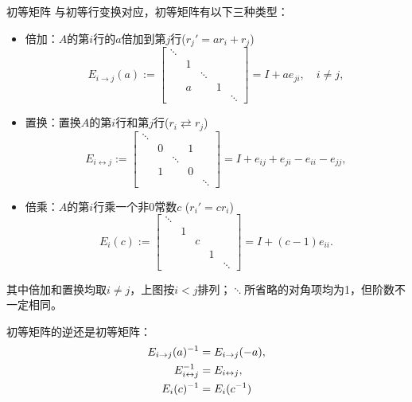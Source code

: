 \begin{definition}
	{初等矩阵}{}
	与初等行变换对应，初等矩阵有以下三种类型：
	\begin{itemize}
		\item 倍加：$A$的第$i$行的$a$倍加到第$j$行($r_j' = ar_i + r_j$)
		\begin{equation}\label{eq:la-row-addition-matrix}
			E_{i\to j}(a) :=
			\begin{bmatrix}
				\ddots\\ &1\\ &&\ddots\\ &a&&1\\ &&&&\ddots
			\end{bmatrix} = I + ae_{ji},\quad i \neq j,
		\end{equation}
		\item 置换：置换$A$的第$i$行和第$j$行($r_i\rightleftarrows r_j$)
		\begin{equation}\label{eq:la-row-exchange-matrix}
			E_{i\leftrightarrow j} :=
			\begin{bmatrix}
				\ddots\\ &0&&1\\ &&\ddots\\ &1&&0\\ &&&&\ddots
			\end{bmatrix} = I + e_{ij} + e_{ji} - e_{ii} - e_{jj},
		\end{equation}
		\item 倍乘：$A$的第$i$行乘一个非0常数$c$ ($r_i' = cr_i$)
		\begin{equation}\label{eq:la-row-scaling-matrix}
			E_i(c) :=
			\begin{bmatrix}
				\ddots\\ &1\\ &&c\\ &&&1\\ &&&&\ddots
			\end{bmatrix} = I + (c - 1)e_{ii}.
		\end{equation}
	\end{itemize}
	其中倍加和置换均取$i \neq j$，上图按$i < j$排列；$\ddots$所省略的对角项均为1，但阶数不一定相同。
\end{definition}

\begin{corollary}
	初等矩阵的逆还是初等矩阵：
	\begin{subequations}
		\begin{align}
			E_{i\to j}(a)^{-1} &= E_{i\to j}(-a),\\
			E_{i\leftrightarrow j}^{-1} &= E_{i\leftrightarrow j},\\
			E_i(c)^{-1} &= E_i(c^{-1})
		\end{align}
	\end{subequations}
\end{corollary}

